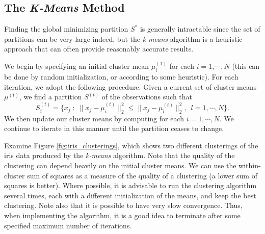 \subsection*{The \emph{K-Means} Method}
Finding the global minimizing partition $S^*$ is generally intractable since the set of partitions can be very large indeed,
but the \emph{k-means} algorithm is a heuristic approach that can often provide reasonably accurate results.


We begin by specifying an initial cluster mean $\mu_i^{(1)}$ for each $i = 1, \cdots, N$ (this can be done by random initialization, or according to some heuristic).
For each iteration, we adopt the following procedure.
Given a current set of cluster means $\mu^{(t)}$, we find a partition $S^{(t)}$ of the observations such that
\begin{equation*}
S_{i}^{(t)} = \{x_j \; : \; \|x_j - \mu_{i}^{(t)}\|_2^2 \leq \|x_j - \mu_{l}^{(t)}\|_2^2,\,\,\,  l = 1, \cdots, N\}.
\end{equation*}
We then update our cluster means by computing for each $i = 1, \cdots, N$.
We continue to iterate in this manner until the partition ceases to change.



Examine Figure \ref{fig:iris_clusterings}, which shows two different clusterings of the iris data produced by the \emph{k-means} algorithm.
Note that the quality of the clustering can depend heavily on the initial cluster means.
We can use the within-cluster sum of squares as a measure of the quality of a clustering (a lower sum of squares is better).
Where possible, it is advisable to run the clustering algorithm several times, each with a different initialization of the means,
and keep the best clustering.
Note also that it is possible to have very slow convergence.
Thus, when implementing the algorithm, it is a good idea to terminate after some specified maximum number of iterations.

